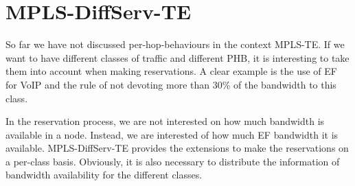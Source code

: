 \section{MPLS-DiffServ-TE}

So far we have not discussed per-hop-behaviours in the context MPLS-TE.  
If we want to have different classes of traffic and different PHB, it is interesting to take them into account when making reservations.
A clear example is the use of EF for VoIP and the rule of not devoting more than 30\% of the bandwidth to this class.

In the reservation process, we are not interested on how much bandwidth is available in a node.
Instead, we are interested of how much EF bandwidth it is available.
MPLS-DiffServ-TE provides the extensions to make the reservations on a per-class basis.
Obviously, it is also necessary to distribute the information of bandwidth availability for the different classes.


